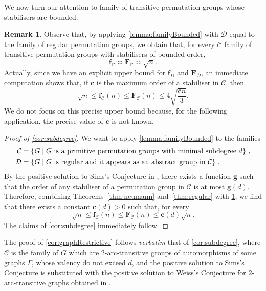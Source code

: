 \documentclass[a4paper]{amsart}
\newcommand{\f}{\mathbf{f}}
\newcommand{\F}{\mathbf{F}}
\newcommand{\C}{\mathcal{C}}
\newcommand{\D}{\mathcal{D}}
\theoremstyle{definition}
\newtheorem{remark}[theorem]{Remark}
\begin{document}
We now turn our attention to family of transitive permutation groups whose stabilisers are bounded.
\begin{remark}\label{remark:familyBounded}
    Observe that, by applying \cref{lemma:familyBounded} with $\D$ equal to the family of regular permutation groups, we obtain that, for every $\C$ family of transitive permutation groups with stabilisers of bounded order,
    \[\f_\C \asymp \F_\C \asymp \sqrt{n} .\]
    Actually, since we have an explicit upper bound for $\f_D$ and $\F_\D$, an immediate computation shows that, if $\mathbf{c}$ is the maximum order of a stabiliser in $\C$, then
    \[ \sqrt{n} \le \f_\C(n) \le \F_\C(n) \le 4\sqrt{\frac{\mathbf{c}n}{3}} .\]
    We do not focus on this precise upper bound because, for the following application, the precise value of $\mathbf{c}$ is not known.
\end{remark}



\begin{proof}[Proof of \cref{cor:subdegree}]
    We want to apply \cref{lemma:familyBounded} to the families
    \begin{align*}
        \C &= \left\{ G  \mid G \hbox{ is a primitive permutation groups with minimal subdegree } d \right\} \,,\\
        \D &= \left\{ G \mid G \hbox{ is regular and it appears as an abstract group in } \C \right\} \,.
    \end{align*}
    By the positive solution to Sims's Conjecture in \cite{CameronPraegerSaxlSeitz1983}, there exists a function $\mathbf{g}$ such that the order of any stabiliser of a permutation group in $\C$ is at most $\mathbf{g}(d)$. Therefore, combining Theorems~\ref{thm:neumann} and~\ref{thm:regular} with \cref{remark:familyBounded}, we find that there exists a constant $\mathbf{c}(d) > 0$ such that, for every
    \[ \sqrt{n} \le \f_\C(n) \le \F_\C(n)  \le \mathbf{c}(d)\sqrt{n} .\]
    The claims of \cref{cor:subdegree} immediately follow.
\end{proof}

The proof of \cref{cor:graphRestrictive} follows \emph{verbatim} that of \cref{cor:subdegree}, where  $\C$ is the family of $G$ which are $2$-arc-transitive groups of automorphisms of some graphs $\Gamma$, whose valency do not exceed $d$, and the positive solution to Sims's Conjecture is substituted with the positive solution to Weiss's Conjecture for $2$-arc-transitive graphs obtained in \cite{Gardiner1976,Trofimov1990,Trofimov1991,Weiss1979,Weiss1993}. 
\end{document}
